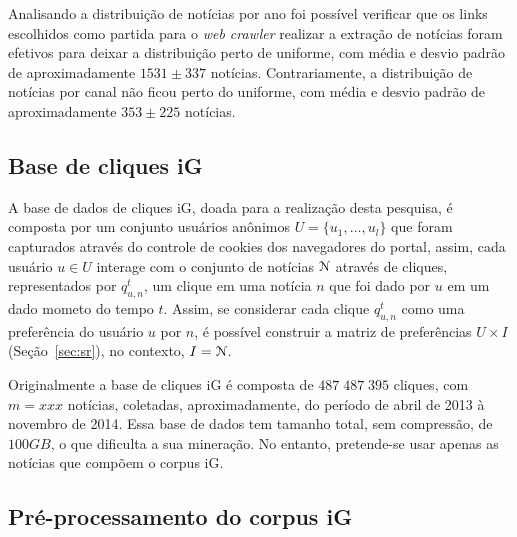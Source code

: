 \documentclass[normaltoc, espacoumemeio, pnumromarab,ruledheader]{abnt}
\begin{document}
Analisando a distribuição de notícias por ano foi possível verificar que os links escolhidos como partida para o \textit{web crawler} realizar a extração de notícias foram efetivos para deixar a distribuição perto de uniforme, com média e desvio padrão de aproximadamente $1531 \pm 337$ notícias.
Contrariamente, a distribuição de notícias por canal não ficou perto do uniforme, com média e desvio padrão de aproximadamente $353 \pm 225$ notícias.

\subsection{Base de cliques iG}
\label{subsec:basecliquesig}

A base de dados de cliques iG, doada para a realização desta pesquisa, é composta por um conjunto usuários anônimos $U = \{ u_1, \dots, u_l \}$ que foram capturados através do controle de cookies dos navegadores do portal, assim, cada usuário $u \in U$ interage com o conjunto de notícias ${\cal N}$ através de cliques, representados por $q_{u,n}^t$, um clique em uma notícia $n$ que foi dado por $u$ em um dado mometo do tempo $t$.
Assim, se considerar cada clique $q_{u,n}^t$ como uma preferência do usuário $u$ por $n$, é possível construir a matriz de preferências $U \times I$ (Seção~\ref{sec:sr}), no contexto, $I = {\cal N}$.

Originalmente a base de cliques iG é composta de $487\;487\;395$ cliques, com $m = xxx$ notícias, coletadas, aproximadamente, do período de abril de 2013 à novembro de 2014. Essa base de dados tem tamanho total, sem compressão, de $100GB$, o que dificulta a sua mineração. No entanto, pretende-se usar apenas as notícias que compõem o corpus iG.

\subsection{Pré-processamento do corpus iG}
\end{document}
